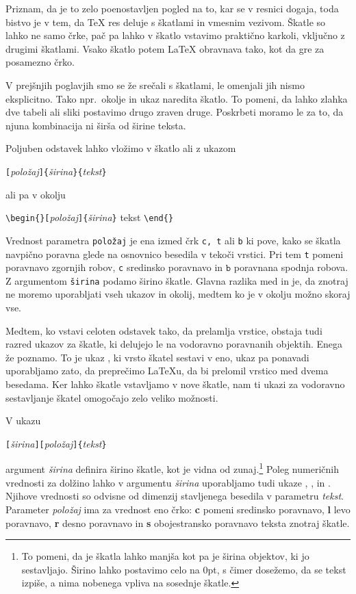 Priznam, da je to zelo poenostavljen pogled na to, kar se v resnici dogaja,
toda bistvo je v tem, da \TeX{} res deluje s škatlami in vmesnim vezivom.
Škatle so lahko ne samo črke, pač pa lahko v škatlo vstavimo praktično karkoli, 
vključno z drugimi škatlami. Vsako škatlo potem \LaTeX{} obravnava tako, kot da gre
za posamezno črko.

V prejšnjih poglavjih smo se že srečali s škatlami, le omenjali jih nismo eksplicitno. 
Tako npr.~okolje  in ukaz  naredita škatlo. To pomeni, da lahko
zlahka dve tabeli ali sliki postavimo drugo zraven druge. Poskrbeti moramo le za to,
da njuna kombinacija ni širša od širine teksta.

Poljuben odstavek lahko vložimo v škatlo ali z ukazom
  \begin{lscommand}  \verb|[|\emph{položaj}\verb|]{|\emph{širina}\verb|}{|\emph{tekst}\verb|}|
  \end{lscommand}
ali pa v okolju
  \begin{lscommand} \verb|\begin{|\verb|}[|\emph{položaj}\verb|]{|\emph{širina}\verb|}| tekst
  \verb|\end{|\verb|}|
\end{lscommand}
Vrednost parametra \texttt{položaj} je ena izmed črk 
\texttt{c, t} ali \texttt{b} ki pove, kako se škatla navpično poravna glede na osnovnico besedila v 
tekoči vrstici. Pri tem \texttt{t} pomeni poravnavo zgornjih robov, \texttt{c} sredinsko poravnavo in 
$\texttt{b}$ poravnana spodnja robova. Z argumentom 
\texttt{širina} podamo širino škatle. Glavna razlika med 
 in  je, da znotraj  ne moremo uporabljati vseh ukazov in okolij,
medtem ko je v okolju  možno skoraj vse.

Medtem, ko  vstavi celoten odstavek tako, da prelamlja vrstice, 
obstaja tudi razred ukazov za škatle, ki delujejo le na vodoravno poravnanih objektih.
Enega že poznamo. To je ukaz , ki vrsto škatel sestavi v eno, ukaz pa 
ponavadi uporabljamo zato, da preprečimo \LaTeX{}u, da bi prelomil vrstico med dvema besedama. 
Ker lahko škatle vstavljamo v nove škatle, nam ti ukazi za vodoravno 
sestavljanje škatel omogočajo zelo veliko možnosti.

V ukazu
\begin{lscommand}
\verb|[|\emph{širina}\verb|][|\emph{položaj}\verb|]{|\emph{tekst}\verb|}|
\end{lscommand}
argument \emph{širina} definira širino škatle, kot je vidna od zunaj.\footnote{To pomeni, da je škatla lahko
  manjša kot pa je širina objektov, ki jo sestavljajo. Širino lahko postavimo celo na 0pt, s čimer dosežemo,
  da se tekst izpiše, a nima nobenega vpliva na sosednje škatle.} Poleg numeričnih vrednosti za dolžino lahko
  v argumentu \emph{širina} uporabljamo tudi ukaze , ,  in
  . Njihove vrednosti so odvisne od dimenzij stavljenega besedila v parametru \emph{tekst}. 
  Parameter \emph{položaj} ima 
za vrednost eno črko: \textbf{c} pomeni sredinsko poravnavo, \textbf{l} levo poravnavo,
  \textbf{r} desno poravnavo in \textbf{s} obojestransko poravnavo teksta znotraj škatle.

